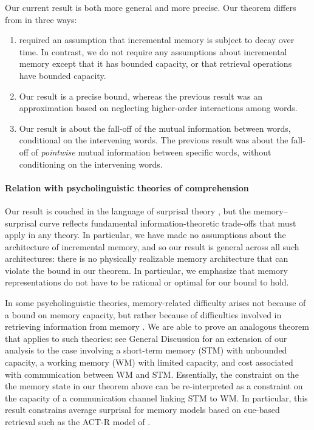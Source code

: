 Our current result is both more general and more precise. Our theorem differs from \citet{futrell-noisy-context-2017} in three ways:
\begin{enumerate}
    \item \citet{futrell-noisy-context-2017} required an assumption that incremental memory is subject to decay over time. In contrast, we do not require any assumptions about incremental memory except that it has bounded capacity, or that retrieval operations have bounded capacity.
    \item Our result is a precise bound, whereas the previous result was an approximation based on neglecting higher-order interactions among words.
    \item Our result is about the fall-off of the mutual information between words, conditional on the intervening words. The previous result was about the fall-off of \emph{pointwise} mutual information between specific words, without conditioning on the intervening words.
\end{enumerate}

\paragraph{Relation with psycholinguistic theories of comprehension} 
Our result is couched in the language of surprisal theory \citep{hale2001probabilistic,levy2008expectation,hale2016information}, but the memory--surprisal curve reflects fundamental information-theoretic trade-offs that must apply in any theory. In particular, we have made no assumptions about the architecture of incremental memory, and so our result is general across all such architectures: there is no physically realizable memory architecture that can violate the bound in our theorem. In particular, we emphasize that memory representations do not have to be rational or optimal for our bound to hold.

In some psycholinguistic theories, memory-related difficulty arises not because of a bound on memory capacity, but rather because of difficulties involved in retrieving information from memory \citep{}. We are able to prove an analogous theorem that applies to such theories: see General Discussion for an extension of our analysis to the case involving a short-term memory (STM) with unbounded capacity, a working memory (WM) with limited capacity, and cost associated with communication between WM and STM. Essentially, the constraint on the the memory state in our theorem above can be re-interpreted as a constraint on the capacity of a communication channel linking STM to WM. In particular, this result constrains average surprisal for memory models based on cue-based retrieval such as the ACT-R model of \citet{lewis-activation-based-2005}.

